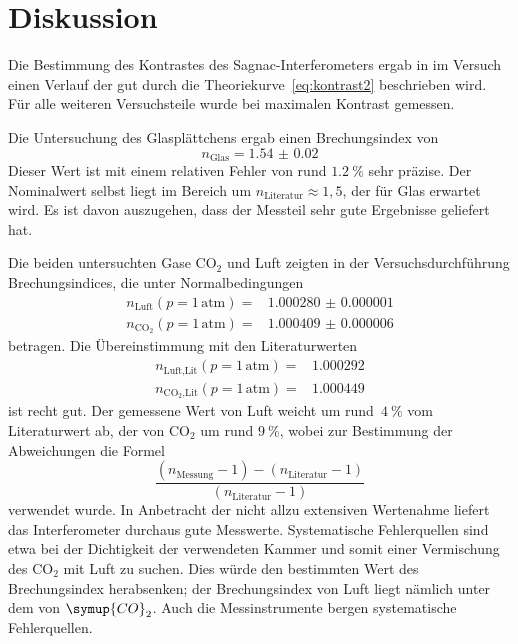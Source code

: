 \section{Diskussion}
\label{sec:diskussion}

Die Bestimmung des Kontrastes des Sagnac-Interferometers ergab in
im Versuch einen Verlauf der gut durch die Theoriekurve~\eqref{eq:kontrast2}
beschrieben wird. Für alle weiteren Versuchsteile wurde bei maximalen Kontrast
gemessen.

Die Untersuchung des Glasplättchens ergab einen Brechungsindex von
\begin{equation}
  n_{\text{Glas}}=\num{1.54(2)}
\end{equation}
Dieser Wert ist mit einem relativen Fehler von rund $\SI{1.2}{\percent}$ sehr
präzise. Der Nominalwert selbst liegt im Bereich um
$n_\text{Literatur}\approx 1,5$, der für Glas erwartet wird. Es ist davon
auszugehen, dass der Messteil sehr gute Ergebnisse geliefert hat.

Die beiden untersuchten Gase $\text{CO}_2$ und Luft zeigten in der
Versuchsdurchführung Brechungsindices, die unter Normalbedingungen
%
\begin{align}
  n_{\text{Luft}}(p=1\,\text{atm})=&\num{1.000280(1)} \\
  n_{\text{CO}_2}(p=1\,\text{atm})=&\num{1.000409(6)}
\end{align}
%
betragen. Die Übereinstimmung mit den Literaturwerten~\cite{brechungsindices}
%
\begin{align}
  n_{\text{Luft}\text{,Lit}}(p=1\,\text{atm})=&\num{1.000292} \\
  n_{\text{CO}_2\text{,Lit}}(p=1\,\text{atm})=&\num{1.000449}
\end{align}
%
ist recht gut. Der gemessene Wert von Luft weicht um
rund~$\SI{4}{\percent}$ vom Literaturwert ab, der von $\text{CO}_2$ um rund
$\SI{9}{\percent}$, wobei zur Bestimmung der Abweichungen die Formel
%
\begin{equation}
  \frac{(n_{\text{Messung}}-1)-(n_{\text{Literatur}}-1)}
  {(n_{\text{Literatur}}-1)}
\end{equation}
%
verwendet wurde. In Anbetracht der nicht allzu extensiven Wertenahme liefert das
Interferometer durchaus gute Messwerte. Systematische Fehlerquellen sind etwa bei
der Dichtigkeit der verwendeten Kammer und somit einer Vermischung des
$\text{CO}_2$ mit Luft zu suchen. Dies würde den bestimmten Wert des
Brechungsindex herabsenken; der Brechungsindex von Luft liegt nämlich unter dem
von $\symup{CO}_2$. Auch die Messinstrumente bergen systematische Fehlerquellen.

